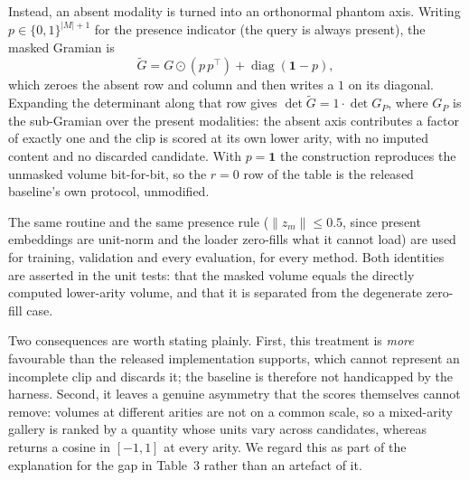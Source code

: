 Instead, an absent modality is turned into an orthonormal phantom axis.
Writing $p \in \{0,1\}^{|M|+1}$ for the presence indicator (the query is
always present), the masked Gramian is
\begin{equation}
\tilde{G} = G \odot (p\,p^{\!\top}) + \operatorname{diag}(\mathbf{1} - p),
\label{eq:maskedgram}
\end{equation}
which zeroes the absent row and column and then writes a $1$ on its
diagonal. Expanding the determinant along that row gives
$\det \tilde{G} = 1 \cdot \det G_{P}$, where $G_{P}$ is the sub-Gramian
over the present modalities: the absent axis contributes a factor of
exactly one and the clip is scored at its own lower arity, with no
imputed content and no discarded candidate. With $p = \mathbf{1}$ the
construction reproduces the unmasked volume bit-for-bit, so the $r{=}0$
row of the table is the released baseline's own protocol, unmodified.

The same routine and the same presence rule ($\|z_m\| \le 0.5$, since
present embeddings are unit-norm and the loader zero-fills what it
cannot load) are used for training, validation and every evaluation, for
every method. Both identities are asserted in the unit tests: that the
masked volume equals the directly computed lower-arity volume, and that
it is separated from the degenerate zero-fill case.

Two consequences are worth stating plainly. First, this treatment is
\emph{more} favourable than the released implementation supports, which
cannot represent an incomplete clip and discards it; the baseline is
therefore not handicapped by the harness. Second, it leaves a genuine
asymmetry that the scores themselves cannot remove: volumes at different
arities are not on a common scale, so a mixed-arity gallery is ranked by
a quantity whose units vary across candidates, whereas \ours{} returns a
cosine in $[-1,1]$ at every arity. We regard this as part of the
explanation for the gap in Table~3 rather than an artefact of it.


%
%
%
%
%

